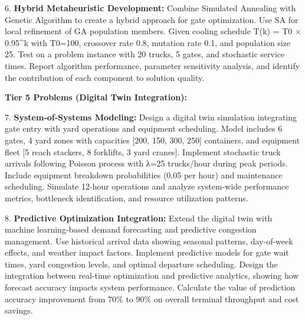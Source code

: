 \documentclass{article}
\begin{document}
6. \textbf{Hybrid Metaheuristic Development:} Combine Simulated Annealing with Genetic Algorithm to create a hybrid approach for gate optimization. Use SA for local refinement of GA population members. Given cooling schedule T(k) = T0 × 0.95^k with T0=100, crossover rate 0.8, mutation rate 0.1, and population size 25. Test on a problem instance with 20 trucks, 5 gates, and stochastic service times. Report algorithm performance, parameter sensitivity analysis, and identify the contribution of each component to solution quality.

\textbf{Tier 5 Problems (Digital Twin Integration):}

7. \textbf{System-of-Systems Modeling:} Design a digital twin simulation integrating gate entry with yard operations and equipment scheduling. Model includes 6 gates, 4 yard zones with capacities [200, 150, 300, 250] containers, and equipment fleet [5 reach stackers, 8 forklifts, 3 yard cranes]. Implement stochastic truck arrivals following Poisson process with λ=25 trucks/hour during peak periods. Include equipment breakdown probabilities (0.05 per hour) and maintenance scheduling. Simulate 12-hour operations and analyze system-wide performance metrics, bottleneck identification, and resource utilization patterns.

8. \textbf{Predictive Optimization Integration:} Extend the digital twin with machine learning-based demand forecasting and predictive congestion management. Use historical arrival data showing seasonal patterns, day-of-week effects, and weather impact factors. Implement predictive models for gate wait times, yard congestion levels, and optimal departure scheduling. Design the integration between real-time optimization and predictive analytics, showing how forecast accuracy impacts system performance. Calculate the value of prediction accuracy improvement from 70\% to 90\% on overall terminal throughput and cost savings.
\end{document}
